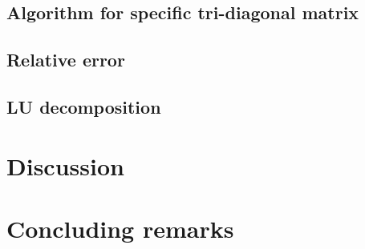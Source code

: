 \documentclass[norsk,a4paper,12pt]{article}
\begin{document}
\subsection{Algorithm for specific tri-diagonal matrix}

 \subsection{Relative error}
 
  \subsection{LU decomposition}
  
  \section{Discussion}
  
  


\section{Concluding remarks}


\end{document}
